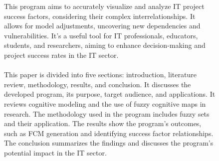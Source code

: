 \documentclass{article}
\begin{document}
\begin{figure}[!t]
\begin{minipage}{0.49\textwidth}
            This program aims to accurately visualize and analyze IT project success factors, considering their complex interrelationships. It allows for model adjustments, uncovering new dependencies and vulnerabilities. It's a useful tool for IT professionals, educators, students, and researchers, aiming to enhance decision-making and project success rates in the IT sector.\\
            ~\\
            This paper is divided into five sections: introduction, literature review, methodology, results, and conclusion. It discusses the developed program, its purpose, target audience, and applications. It reviews cognitive modeling and the use of fuzzy cognitive maps in research. The methodology used in the program includes fuzzy sets and their application. The results show the program's outcomes, such as FCM generation and identifying success factor relationships. The conclusion summarizes the findings and discusses the program's potential impact in the IT sector.\\
            ~\\
            ~\\
            ~\\
            ~\\
            ~\\
            ~\\
            ~\\
            ~\\
            ~\\
            ~\\
            ~\\
            ~\\
            ~\\
            ~\\
            ~\\
            ~\\
            ~\\
            ~\\
            ~\\
            ~\\
            ~\\
            ~\\
            ~\\
            ~\\
            ~\\
            ~\\
            ~\\

\end{minipage}
\end{figure}
\end{document}
